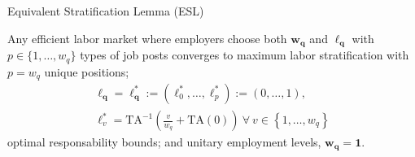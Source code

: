 \documentclass[hidelinks, nonatbib]{elsarticle}
\begin{document}
\begin{enumerate}

Equivalent Stratification Lemma (ESL)

Any efficient labor market where employers choose both $\boldsymbol{w_q}$ and $\boldsymbol{\ell_q}$ with $p \in \{1, \dots, w_q\}$ types of job posts converges to maximum labor stratification with
$
    p = w_q
$
unique positions;
\begin{gather}
    \boldsymbol{\ell_q} = 
    \boldsymbol{\ell_{q}^{*}}
    :=
    (
        \ell_{0}^{*}
        ,
        \dots
        ,
        \ell_{p}^{*}
    )
    :=
    (
        0
        ,
        \dots
        ,
        1
    )
    ,
    \\
    \ell_{v}^{*}
    =
    \text{TA}^{-1}\left(
        \frac{v}{w_q}
        +
        \text{TA}(0)
    \right)
    \
    \forall
    \
    v \in 
    \left\{
        1, \dots, w_q
    \right\}
\end{gather}
optimal responsability bounds; and unitary employment levels,
$
    \boldsymbol{w_q} =
    \boldsymbol{1}
    .
$


\end{enumerate}
\end{document}
